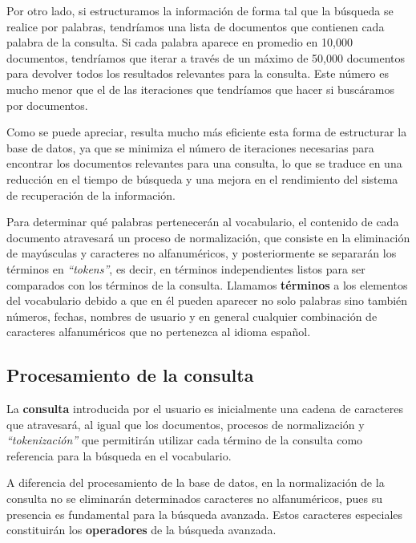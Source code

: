 \documentclass[12pt, letterpaper]{article}
\begin{document}
        Por otro lado, si estructuramos la información de forma tal que la búsqueda se realice por palabras, tendríamos una lista de documentos que contienen cada palabra de la consulta. Si cada palabra aparece en promedio en 10,000 documentos, tendríamos que iterar a través de un máximo de 50,000 documentos para devolver todos los resultados relevantes para la consulta. Este número es mucho menor que el de las iteraciones que tendríamos que hacer si buscáramos por documentos.
        
        Como se puede apreciar, resulta mucho más eficiente esta forma de estructurar la base de datos, ya que se minimiza el número de iteraciones necesarias para encontrar los documentos relevantes para una consulta, lo que se traduce en una reducción en el tiempo de búsqueda y una mejora en el rendimiento del sistema de recuperación de la información.
       
        Para determinar qué palabras pertenecerán al vocabulario, el contenido de cada documento atravesará un proceso de normalización, que consiste en la eliminación de mayúsculas y caracteres no alfanuméricos, y posteriormente se separarán los términos en \textit{“tokens”}, es decir, en términos independientes listos para ser comparados con los términos de la consulta. Llamamos \textbf{términos} a los elementos del vocabulario debido a que en él pueden aparecer no solo palabras sino también números, fechas, nombres de usuario y en general cualquier combinación de caracteres alfanuméricos que no pertenezca al idioma español.
    \subsection{Procesamiento de la consulta}
    La \textbf{consulta} introducida por el usuario es inicialmente una cadena de caracteres que atravesará, al igual que los documentos, procesos de normalización y \textit{“tokenización”} que permitirán utilizar cada término de la consulta  como referencia para la búsqueda en el vocabulario.
   
    A diferencia del procesamiento de la base de datos, en la normalización de la consulta no se eliminarán determinados caracteres no alfanuméricos, pues su presencia es fundamental para la búsqueda avanzada. Estos caracteres especiales constituirán los \textbf{operadores} de la búsqueda avanzada.
\end{document}
